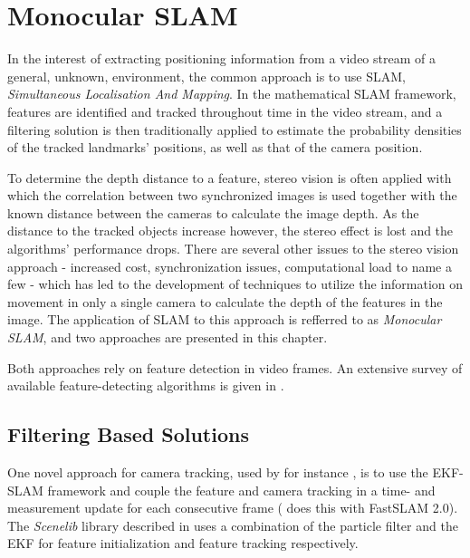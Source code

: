\chapter{Monocular SLAM}
\label{cha:monoslam}
    In the interest of extracting positioning information from a video stream
    of a general, unknown, environment, the common approach is to use SLAM,
    \textit{Simultaneous Localisation And Mapping}.
    In the mathematical SLAM framework, features are identified and tracked throughout time
    in the video stream, and a filtering solution is then traditionally applied
    to estimate the probability densities of the tracked landmarks' positions, as well as
    that of the camera position.

    To determine the depth distance to a feature, stereo vision is often applied
    with which the correlation between two synchronized images is used together with the known
    distance between the cameras to calculate the image depth.
    As the distance to the tracked objects increase however, the stereo
    effect is lost and the algorithms' performance drops.
    There are several other issues to the stereo vision approach - increased
    cost, synchronization issues, computational load to name a few - which has
    led to the development of techniques to utilize the information on movement in only a single
    camera to calculate the depth of the features in the image.
    The application of SLAM to this approach is refferred to as \textit{Monocular SLAM},
    and two approaches are presented in this chapter.

    Both approaches rely on feature detection in video frames.
    An extensive survey of available feature-detecting algorithms
    is given in \citep{idris09reviewoffeaturedetection}.

    \section{Filtering Based Solutions}
        One novel approach for camera tracking, used by for instance \citep{DBLP:conf/iccv/Davison03},
        is to use the EKF-SLAM framework and couple the feature
        and camera tracking in a time- and measurement update for each consecutive
        frame (\citep{Eade:2006:SMS:1153170.1153506} does this with FastSLAM 2.0).
        The \textit{Scenelib} library described in \citep{DBLP:conf/iccv/Davison03}
        uses a combination of the particle filter and the EKF for feature initialization
        and feature tracking respectively.

